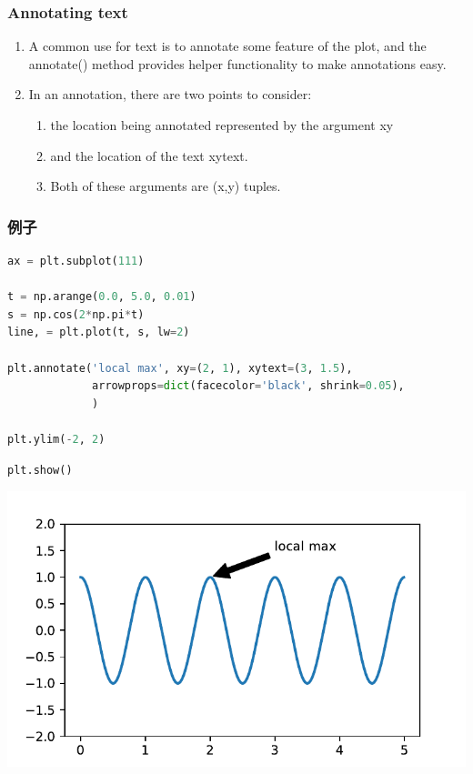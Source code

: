 \documentclass[UTF8,a4paper,12pt]{ctexart}  %
\providecommand{\tightlist}{\setlength{\itemsep}{0pt}\setlength{\parskip}{0pt}}
\begin{document}
\hypertarget{annotating-text}{%
\subsubsection{Annotating text}\label{annotating-text}}

\begin{enumerate}
\def\labelenumi{\arabic{enumi}.}
\tightlist
\item
  A common use for text is to annotate some feature of the plot, and
  the annotate() method provides helper functionality to make
  annotations easy.
\item
  In an annotation, there are two points to consider:

  \begin{enumerate}
  \def\labelenumii{\arabic{enumii}.}
  \tightlist
  \item
    the location being annotated represented by the argument xy
  \item
    and the location of the text xytext.
  \item
    Both of these arguments are (x,y) tuples.
  \end{enumerate}
\end{enumerate}

\hypertarget{ux4f8bux5b50-2}{%
\subsubsection{例子}\label{ux4f8bux5b50-2}}

\begin{lstlisting}[language=Python]
ax = plt.subplot(111)

t = np.arange(0.0, 5.0, 0.01)
s = np.cos(2*np.pi*t)
line, = plt.plot(t, s, lw=2)

plt.annotate('local max', xy=(2, 1), xytext=(3, 1.5),
             arrowprops=dict(facecolor='black', shrink=0.05),
             )

plt.ylim(-2, 2)
\end{lstlisting}

\begin{lstlisting}[language=Python]
plt.show()
\end{lstlisting}

\begin{center}\includegraphics[width=0.9\linewidth]{python-visualization_files/figure-latex/unnamed-chunk-19-1} \end{center}
\end{document}
